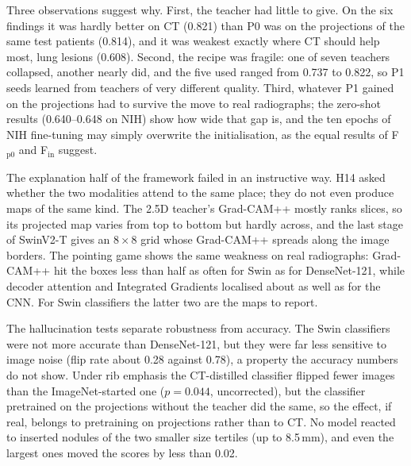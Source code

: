 Three observations suggest why. First, the teacher had little to give. On the six findings it was hardly better on CT (0.821) than P0 was
on the projections of the same test patients (0.814), and it was weakest exactly where CT should help most, lung lesions (0.608). Second, the
recipe was fragile: one of seven teachers collapsed, another nearly did, and the five used ranged from 0.737 to 0.822, so P1 seeds learned
from teachers of very different quality. Third, whatever P1 gained on the projections had to survive the move to real radiographs; the
zero-shot results (0.640--0.648 on NIH) show how wide that gap is, and the ten epochs of NIH fine-tuning may simply overwrite the
initialisation, as the equal results of F$_\mathrm{p0}$ and F$_\mathrm{in}$ suggest.

The explanation half of the framework failed in an instructive way. H14 asked whether the two modalities attend to the same place; they do
not even produce maps of the same kind. The 2.5D teacher's Grad-CAM++ mostly ranks slices, so its projected map varies from top to bottom
but hardly across, and the last stage of SwinV2-T gives an $8\times8$ grid whose Grad-CAM++ spreads along the image borders. The pointing
game shows the same weakness on real radiographs: Grad-CAM++ hit the boxes less than half as often for Swin as for DenseNet-121, while
decoder attention and Integrated Gradients localised about as well as for the CNN. For Swin classifiers the latter two are the maps to
report.

The hallucination tests separate robustness from accuracy. The Swin classifiers were not more accurate than DenseNet-121, but they were
far less sensitive to image noise (flip rate about 0.28 against 0.78), a property the accuracy numbers do not show. Under rib emphasis the
CT-distilled classifier flipped fewer images than the ImageNet-started one ($p=0.044$, uncorrected), but the classifier pretrained on the
projections without the teacher did the same, so the effect, if real, belongs to pretraining on projections rather than to CT. No model
reacted to inserted nodules of the two smaller size tertiles (up to 8.5\,mm), and even the largest ones moved the scores by less than
0.02.

